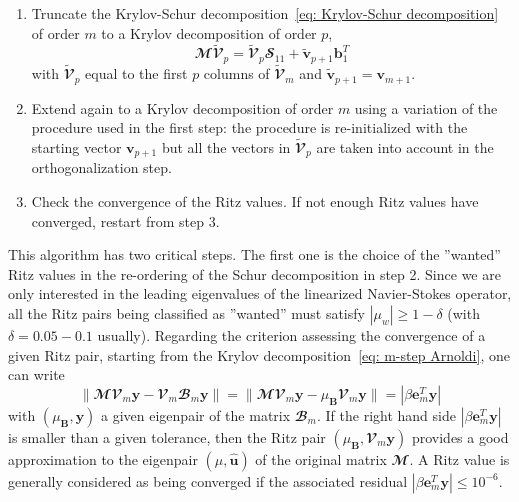 \begin{enumerate}
      \item Truncate the Krylov-Schur decomposition~\eqref{eq: Krylov-Schur decomposition} of order $m$ to a Krylov decomposition of order $p$,
        \begin{equation}
          \mathbfcal{M}\tilde{\mathbfcal{V}}_p = \tilde{\mathbfcal{V}}_p \mathbfcal{S}_{11} + \tilde{\mathbf v}_{p+1}{\mathbf b}_1^T
        \end{equation}
      with $\tilde{\mathbfcal{V}}_p$ equal to the first $p$ columns of $\tilde{\mathbfcal{V}}_m$ and $\tilde{\mathbf v}_{p+1} = {\mathbf v}_{m+1}$.

      \item Extend again to a Krylov decomposition of order $m$ using a variation of the procedure used in the first step: the procedure is re-initialized with the starting vector ${\mathbf v}_{p+1}$ but all the vectors in $\tilde{\mathbfcal{V}}_p$ are taken into account in the orthogonalization step.

      \item Check the convergence of the Ritz values. If not enough Ritz values have converged, restart from step 3.

    \end{enumerate}
    This algorithm has two critical steps. The first one is the choice of the ''wanted'' Ritz values in the re-ordering of the Schur decomposition in step 2. Since we are only interested in the leading eigenvalues of the linearized Navier-Stokes operator, all the Ritz pairs being classified as ''wanted'' must satisfy $\left| \mu_w \right| \ge 1 - \delta$ (with $\delta = 0.05 - 0.1$ usually). Regarding the criterion assessing the convergence of a given Ritz pair, starting from the Krylov decomposition~\eqref{eq: m-step Arnoldi}, one can write
    \begin{equation}
      \| \mathbfcal{M} \mathbfcal{V}_m \mathbf{y} - \mathbfcal{V}_m \mathbfcal{B}_m \mathbf{y} \| = \| \mathbfcal{M} \mathbfcal{V}_m \mathbf{y} - \mu_{\mathbf B} \mathbfcal{V}_m \mathbf{y} \| = \left| \beta \mathbf{e}_m^T \mathbf{y} \right|
      \label{eq: Krylov convergence}
    \end{equation}
    with $(\mu_{\mathbf B},\mathbf{y})$ a given eigenpair of the matrix $\mathbfcal{B}_m$. If the right hand side $\left| \beta {\mathbf e}_{m}^T{\mathbf y} \right|$ is smaller than a given tolerance, then the Ritz pair $(\mu_{\mathbf B}, \mathbfcal{V}_m {\mathbf y})$ provides a good approximation to the eigenpair $(\mu, \hat{\mathbf u})$ of the original matrix $\mathbfcal{M}$. A Ritz value is generally considered as being converged if the associated residual $\left| \beta {\mathbf e}_{m}^T{\mathbf y} \right| \le 10^{-6}$.

